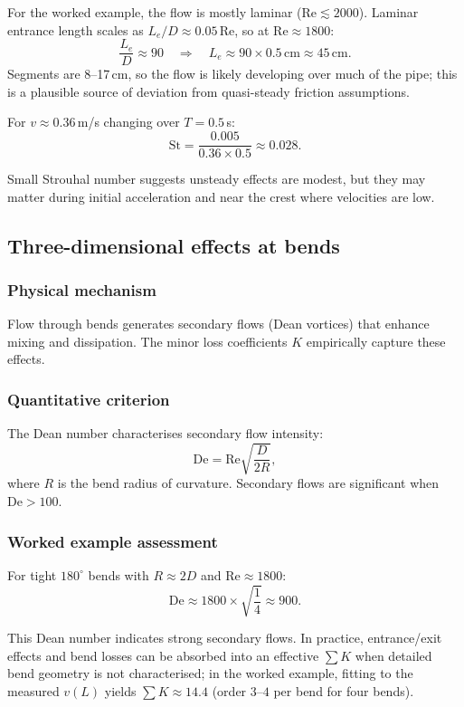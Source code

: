 \documentclass[11pt]{article}
\begin{document}
For the worked example, the flow is mostly laminar ($\text{Re} \lesssim 2000$). Laminar entrance length scales as $L_e/D \approx 0.05\,\text{Re}$, so at $\text{Re} \approx 1800$:
\[
  \frac{L_e}{D} \approx 90 \quad \Rightarrow \quad L_e \approx 90 \times 0.5\,\text{cm} \approx 45\,\text{cm}.
\]
Segments are 8--17\,cm, so the flow is likely developing over much of the pipe; this is a plausible source of deviation from quasi-steady friction assumptions.

For $v \approx 0.36$\,m/s changing over $T = 0.5$\,s:
\[
  \text{St} = \frac{0.005}{0.36 \times 0.5} \approx 0.028.
\]

Small Strouhal number suggests unsteady effects are modest, but they may matter during initial acceleration and near the crest where velocities are low.

\subsection{Three-dimensional effects at bends}

\subsubsection{Physical mechanism}

Flow through bends generates secondary flows (Dean vortices) that enhance mixing and dissipation. The minor loss coefficients $K$ empirically capture these effects.

\subsubsection{Quantitative criterion}

The Dean number characterises secondary flow intensity:
\begin{equation}
  \text{De} = \text{Re}\sqrt{\frac{D}{2R}},
  \label{eq:dean}
\end{equation}
where $R$ is the bend radius of curvature. Secondary flows are significant when $\text{De} > 100$.

\subsubsection{Worked example assessment}

For tight $180^\circ$ bends with $R \approx 2D$ and $\text{Re} \approx 1800$:
\[
  \text{De} \approx 1800 \times \sqrt{\frac{1}{4}} \approx 900.
\]

This Dean number indicates strong secondary flows. In practice, entrance/exit effects and bend losses can be absorbed into an effective $\sum K$ when detailed bend geometry is not characterised; in the worked example, fitting to the measured $v(L)$ yields $\sum K \approx 14.4$ (order $3$--$4$ per bend for four bends).
\end{document}
